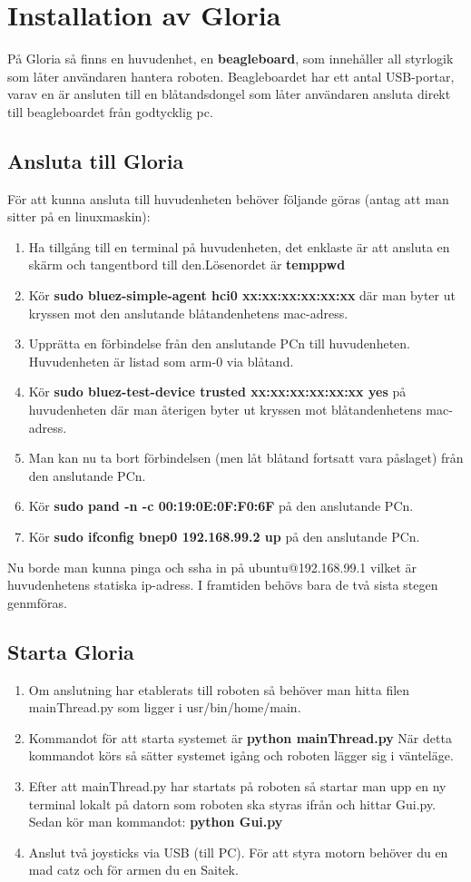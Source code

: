 \section{Installation av Gloria}
På Gloria så finns en huvudenhet, en \textbf{beagleboard}, som innehåller all styrlogik som låter användaren hantera roboten. Beagleboardet har ett antal USB-portar, varav en är ansluten till en blåtandsdongel som låter användaren ansluta direkt till beagleboardet från godtycklig pc.

\subsection{Ansluta till Gloria}
För att kunna ansluta till huvudenheten behöver följande göras (antag att man sitter på en linuxmaskin):
\begin{enumerate}
	\item Ha tillgång till en terminal på huvudenheten, det enklaste är att ansluta en skärm och tangentbord till den.\newline Lösenordet är \textbf{temppwd}
	\item Kör \textbf{sudo bluez-simple-agent hci0 xx:xx:xx:xx:xx:xx} där man byter ut kryssen mot den anslutande blåtandenhetens mac-adress.
	\item Upprätta en förbindelse från den anslutande PCn till huvudenheten. Huvudenheten är listad som arm-0 via blåtand.
	\item Kör \textbf{sudo bluez-test-device trusted xx:xx:xx:xx:xx:xx yes} på huvudenheten där man återigen byter ut kryssen mot blåtandenhetens mac-adress.
	\item Man kan nu ta bort förbindelsen (men låt blåtand fortsatt vara påslaget) från den anslutande PCn.
	\item Kör \textbf{sudo pand -n -c 00:19:0E:0F:F0:6F	} på den anslutande PCn.
	\item Kör \textbf{sudo ifconfig bnep0 192.168.99.2 up } på den anslutande PCn.
\end{enumerate}
Nu borde man kunna pinga och ssha in på ubuntu@192.168.99.1 vilket är huvudenhetens statiska ip-adress. I framtiden behövs bara de två sista stegen genmföras.
\subsection{Starta Gloria}
\begin{enumerate}
	\item Om anslutning har etablerats till roboten så behöver man hitta filen mainThread.py som ligger i usr/bin/home/main.
	\item Kommandot för att starta systemet är \textbf{python mainThread.py}
	När detta kommandot körs så sätter systemet igång och roboten lägger sig i vänteläge.
	\item Efter att mainThread.py har startats på roboten så startar man upp en ny terminal lokalt på datorn som roboten ska styras ifrån och hittar Gui.py. Sedan kör man kommandot: \textbf{python Gui.py}
	\item Anslut två joysticks via USB (till PC). För att styra motorn behöver du en mad catz och för armen du en Saitek.
\end{enumerate}

